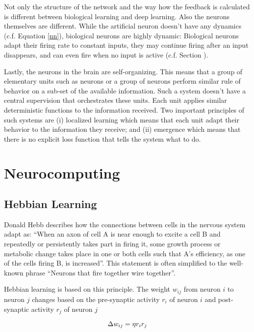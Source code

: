 Not only the structure of the network and the way how the feedback is calculated is different between biological learning and deep learning.
Also the neurons themselves are different.
While the artificial neuron doesn't have any dynamics (c.f. Equation \eqref*{nn}), biological neurons are highly dynamic:
Biological neurons adapt their firing rate to constant inputs, they may continue firing after an input disappears, and can even fire when no input is active (c.f. Section ).

Lastly, the neurons in the brain are self-organizing.
This means that a group of elementary units such as neurons or a group of neurons perform similar rule of behavior on a sub-set of the available information.
Such a system doesn't have a central supervision that orchestrates these units.
Each unit applies similar deterministic functions to the information received.
Two important principles of such systems are (i) localized learning which means that each unit adapt their behavior to the information they receive; and (ii) emergence which means that there is no explicit loss function that tells the system what to do.


\section{Neurocomputing}

\subsection{Hebbian Learning}
Donald Hebb  describes how the connections between cells in the nervous system adapt as: ``When an axon of cell A is near enough to excite a cell B and repeatedly or persistently takes part in firing it, some growth process or metabolic change takes place in one or both cells such that A’s efficiency, as one of the cells firing B, is increased''. This statement is often simplified to the well-known phrase ``Neurons that fire together wire together''.

Hebbian learning is based on this principle.
The weight \(w_{ij}\) from neuron \(i\) to neuron \(j\) changes based on the pre-synaptic activity \(r_i\) of neuron \(i\) and post-synaptic activity \(r_j\) of neuron \(j\)

\begin{equation}\eqlbl{hebb_1}
	\Delta w_{ij} = \eta r_i r_j
\end{equation}

